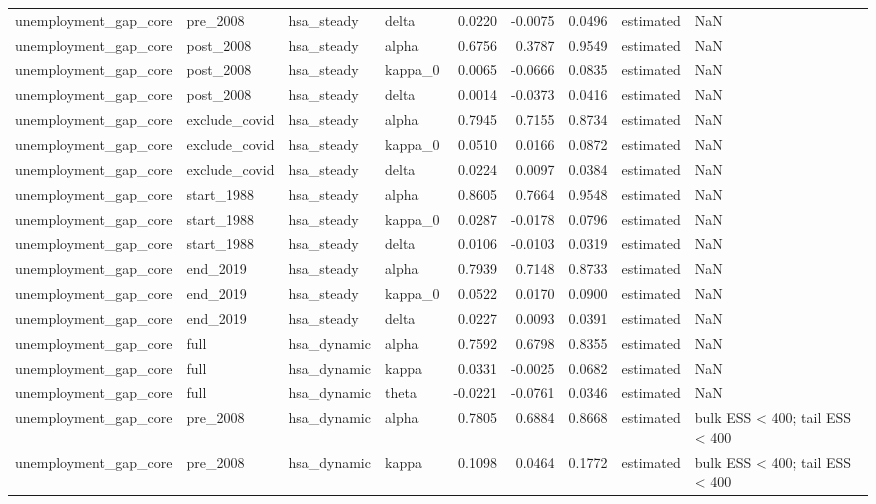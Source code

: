 \begin{tabular}{llllrrrll}
unemployment\_gap\_core & pre\_2008 & hsa\_steady & delta & 0.0220 & -0.0075 & 0.0496 & estimated & NaN \\
unemployment\_gap\_core & post\_2008 & hsa\_steady & alpha & 0.6756 & 0.3787 & 0.9549 & estimated & NaN \\
unemployment\_gap\_core & post\_2008 & hsa\_steady & kappa\_0 & 0.0065 & -0.0666 & 0.0835 & estimated & NaN \\
unemployment\_gap\_core & post\_2008 & hsa\_steady & delta & 0.0014 & -0.0373 & 0.0416 & estimated & NaN \\
unemployment\_gap\_core & exclude\_covid & hsa\_steady & alpha & 0.7945 & 0.7155 & 0.8734 & estimated & NaN \\
unemployment\_gap\_core & exclude\_covid & hsa\_steady & kappa\_0 & 0.0510 & 0.0166 & 0.0872 & estimated & NaN \\
unemployment\_gap\_core & exclude\_covid & hsa\_steady & delta & 0.0224 & 0.0097 & 0.0384 & estimated & NaN \\
unemployment\_gap\_core & start\_1988 & hsa\_steady & alpha & 0.8605 & 0.7664 & 0.9548 & estimated & NaN \\
unemployment\_gap\_core & start\_1988 & hsa\_steady & kappa\_0 & 0.0287 & -0.0178 & 0.0796 & estimated & NaN \\
unemployment\_gap\_core & start\_1988 & hsa\_steady & delta & 0.0106 & -0.0103 & 0.0319 & estimated & NaN \\
unemployment\_gap\_core & end\_2019 & hsa\_steady & alpha & 0.7939 & 0.7148 & 0.8733 & estimated & NaN \\
unemployment\_gap\_core & end\_2019 & hsa\_steady & kappa\_0 & 0.0522 & 0.0170 & 0.0900 & estimated & NaN \\
unemployment\_gap\_core & end\_2019 & hsa\_steady & delta & 0.0227 & 0.0093 & 0.0391 & estimated & NaN \\
unemployment\_gap\_core & full & hsa\_dynamic & alpha & 0.7592 & 0.6798 & 0.8355 & estimated & NaN \\
unemployment\_gap\_core & full & hsa\_dynamic & kappa & 0.0331 & -0.0025 & 0.0682 & estimated & NaN \\
unemployment\_gap\_core & full & hsa\_dynamic & theta & -0.0221 & -0.0761 & 0.0346 & estimated & NaN \\
unemployment\_gap\_core & pre\_2008 & hsa\_dynamic & alpha & 0.7805 & 0.6884 & 0.8668 & estimated & bulk ESS < 400; tail ESS < 400 \\
unemployment\_gap\_core & pre\_2008 & hsa\_dynamic & kappa & 0.1098 & 0.0464 & 0.1772 & estimated & bulk ESS < 400; tail ESS < 400 \\

\end{tabular}
